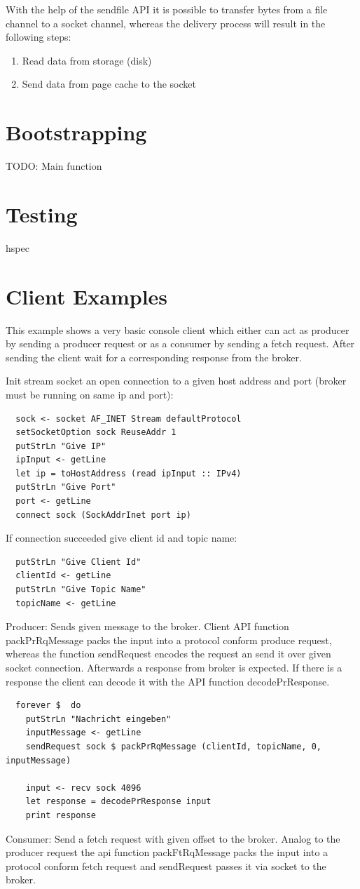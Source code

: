 With the help of the sendfile API  it is possible to transfer bytes
from a file channel to a socket channel, whereas the delivery process will
result in the following steps:

\begin{enumerate}
  \item Read data from storage (disk)
  \item Send data from page cache to the socket
\end{enumerate}


\section{Bootstrapping}
TODO: Main function 


\section{Testing}
hspec 


\section{Client Examples}
This example shows a very basic console client which either can act as producer
by sending a producer request or as a consumer by sending a fetch request. After
sending the client wait for a corresponding response from the broker.

Init stream socket an open connection to a given host address and port (broker must be running on same ip and port): 
\begin{lstlisting}
  sock <- socket AF_INET Stream defaultProtocol 
  setSocketOption sock ReuseAddr 1
  putStrLn "Give IP"
  ipInput <- getLine
  let ip = toHostAddress (read ipInput :: IPv4)
  putStrLn "Give Port"
  port <- getLine
  connect sock (SockAddrInet port ip)
\end{lstlisting}

If connection succeeded give client id and topic name: 
\begin{lstlisting}
  putStrLn "Give Client Id"
  clientId <- getLine
  putStrLn "Give Topic Name"
  topicName <- getLine
\end{lstlisting}

Producer: Sends given message to the broker. Client API function packPrRqMessage
packs the input into a protocol conform produce request, whereas the function
sendRequest encodes the request an send it over given socket connection.
Afterwards a response from broker is expected. If there is a response the client
can decode it with the API function decodePrResponse. 
\begin{lstlisting}
  forever $  do 
    putStrLn "Nachricht eingeben"
    inputMessage <- getLine
    sendRequest sock $ packPrRqMessage (clientId, topicName, 0, inputMessage)

    input <- recv sock 4096
    let response = decodePrResponse input
    print response 
\end{lstlisting}

Consumer: Send a fetch request with given offset to the broker. Analog to the producer request 
the api function packFtRqMessage packs the input into a protocol conform fetch request and sendRequest passes it via socket to the broker. 


